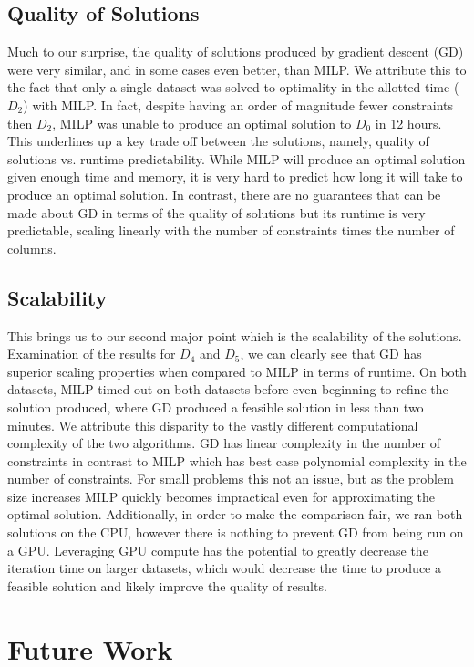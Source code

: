 \documentclass[a4paper]{article}
\begin{document}
\subsection{Quality of Solutions}

Much to our surprise, the quality of solutions produced by gradient descent
(GD) were very similar, and in some cases even better, than MILP. We attribute this
to the fact that only a single dataset was solved to optimality in the 
allotted time ($D_2$) with MILP.  In fact, despite having an order of magnitude 
fewer constraints then $D_2$, MILP was unable to produce an optimal solution to $D_0$ 
in 12 hours.  This underlines up a key trade off
between the solutions, namely, quality of solutions vs. runtime predictability.
While MILP will produce an optimal solution given enough time and memory, it is
very hard to predict how long it will take to produce an optimal solution. 
In contrast, there are no guarantees that can be made about GD in terms of
the quality of solutions but its runtime is very predictable, scaling
linearly with the number of constraints times the number of columns. 

\subsection{Scalability}

This brings us to our second major point which is the scalability of the
solutions. Examination of the results for $D_4$ and $D_5$, we can clearly see
that GD has superior scaling properties when compared to MILP in terms of
runtime. On both datasets, MILP timed out on both datasets before even
beginning to refine the solution produced, where GD produced a feasible
solution in less than two minutes.  We attribute this disparity to the vastly
different computational complexity of the two algorithms. GD has linear
complexity in the number of constraints in contrast to MILP which has best case
polynomial complexity in the number of constraints. For small problems this not
an issue, but as the problem size increases MILP quickly becomes impractical
even for approximating the optimal solution. Additionally, in order to make the
comparison fair, we ran both solutions on the CPU, however there is nothing to
prevent GD from being run on a GPU. Leveraging GPU compute has the potential to
greatly decrease the iteration time on larger datasets, which would decrease
the time to produce a feasible solution and likely improve the quality of
results.

\section{Future Work}
\end{document}
